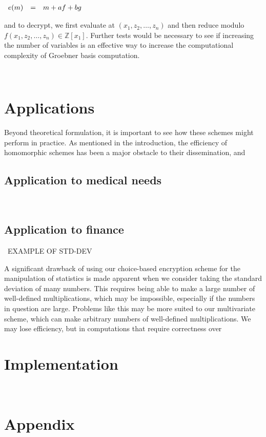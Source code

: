 \documentclass[11pt]{report}
\newcommand{\Z}{\mathbb{Z}}
\newcommand{\ba}{\\ \begin{array}{rcl}}
\newcommand{\ea}{\end{array} \\}
\begin{document}
$\ba
e(m) & = & m + af + bg
\ea$

and to decrypt, we first evaluate at $(x_1,z_2,\ldots,z_n)$ and then reduce modulo $f(x_1,z_2,\ldots,z_n) \in \Z[x_1]$. Further tests would be necessary to see if increasing the number of variables is an effective way to increase the computational complexity of Groebner basis computation. 

\


\chapter{Applications}

Beyond theoretical formulation, it is important to see how these schemes might perform in practice. As mentioned in the introduction, the efficiency of homomorphic schemes has been a major obstacle to their dissemination, and 

\section{Application to medical needs}

\

\section{Application to finance}

\ EXAMPLE OF STD-DEV

A significant drawback of using our choice-based encryption scheme for the manipulation of statistics is made apparent when we consider taking the standard deviation of many numbers. This requires being able to make a large number of well-defined multiplications, which may be impossible, especially if the numbers in question are large. Problems like this may be more suited to our multivariate scheme, which can make arbitrary numbers of well-defined multiplications. We may lose efficiency, but in computations that require correctness over

\chapter{Implementation}
\label{chap:implementation}

\

\chapter{Appendix}
\end{document}
